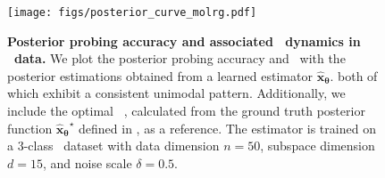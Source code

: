 \begin{figure}[t]
    \centering
    \texttt{[image: figs/posterior\_curve\_molrg.pdf]}
\caption{\textbf{Posterior probing accuracy and associated \CSNR~dynamics in \MoLRG~data.} We plot the posterior probing accuracy and \CSNR~with the posterior estimations obtained from a learned estimator $\bm{\hat x_\theta}$. both of which exhibit a consistent unimodal pattern. Additionally, we include the optimal \CSNR~, calculated from the ground truth posterior function $\bm{\hat x_\theta}^\star$ defined in , as a reference. The estimator is trained on a 3-class \MoLRG~dataset with data dimension $n=50$, subspace dimension $d=15$, and noise scale $\delta=0.5$.}
\label{fig:csnr_molrg_match}
\end{figure}




